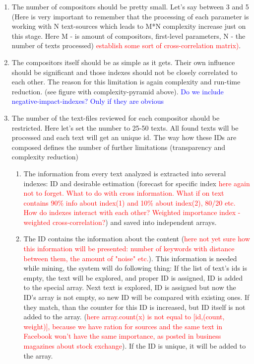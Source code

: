 \documentclass[11pt]{article}
\begin{document}
\begin{enumerate}
	\item The number of compositors should be pretty small. Let's say between 3 and 5 (Here is very important to remember that the processing of each parameter is working with N text-sources which leads to M*N complexity increase just on this stage. Here M - is amount of compositors, first-level parameters, N - the number of texts processed) \textcolor{red}{establish some sort of cross-correlation matrix)}.\\
	\item The compositors itself should be as simple as it gets. Their own influence should be significant and those indexes should not be closely correlated to each other. The reason for this limitation is again complexity and run-time reduction. (see figure with complexity-pyramid above). \textcolor{blue}{Do we include negative-impact-indexes? Only if they are obvious}\\
	\item The number of the text-files reviewed for each compositor should be restricted. Here let's set the number to 25-50 texts. All found texts will be processed and each text will get an unique id. The way how these IDs are composed defines the number of further limitations (transparency and complexity reduction)\\
	\begin{enumerate}
		\item The information from every text analyzed is extracted into several indexes: ID and desirable estimation (forecast for specific index \textcolor{red}{here again not to forget. What to do with cross information. What if on text contains 90\% info about index(1) and 10\% about index(2), 80/20 etc. How do indexes interact with each other? Weighted importance index - weighted cross-correlation?}) and saved into independent arrays.
		\item The ID contains the information about the content (\textcolor{red}{here not yet sure how this information will be presented: number of keywords with distance between them, the amount of "noise" etc.}). This information is needed while mining, the system will do following thing: If the list of text's ids is empty, the text will be explored, and proper ID is assigned, ID is added to the special array. Next text is explored, ID is assigned but now the ID's array is not empty, so new ID will be compared with existing ones. If they match, than the counter for this ID is increased, but ID itself is not added to the array. (\textcolor{red}{here array.count(x) is not equal to [id,(count, weight)], because we have ration for sources and the same text in Facebook won't have the same importance, as posted in business magazines about stock exchange}). If the ID is unique, it will be added to the array.

\end{enumerate}
\end{enumerate}
\end{document}
